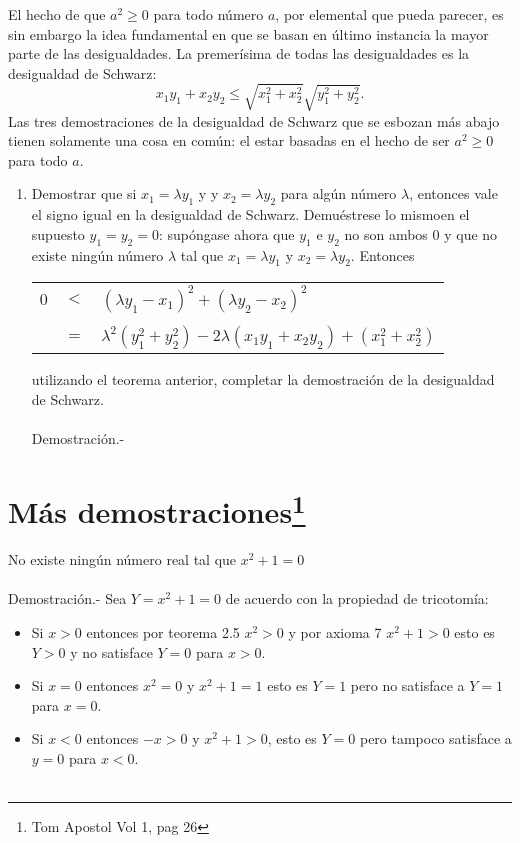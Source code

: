 \begin{teo}
El hecho de que $a^2 \geq 0$ para todo número $a$, por elemental que pueda parecer, es sin embargo la idea fundamental en que se basan en último instancia la mayor parte de las desigualdades. La premerísima de todas las desigualdades es la desigualdad de Schwarz: $$x_1y_1 + x_2y_2 \leq \sqrt{x_1^2 +x_2^2}\sqrt{y_1^2+y_2^2}.$$ Las tres demostraciones de la desigualdad de Schwarz que se esbozan más abajo tienen solamente una cosa en común: el estar basadas en el hecho de ser $a^2\geq 0$ para todo $a$.
\begin{enumerate}[\bfseries a)]
\item Demostrar que si $x_1=\lambda y_1$ \; y \; y $x_2=\lambda y_2$ para algún número $\lambda$, entonces vale el signo igual en la desigualdad de Schwarz. Demuéstrese lo mismoen el supuesto $y_1=y_2=0$: supóngase ahora que $y_1$ e $y_2$ no son ambos $0$ y que no existe ningún número $\lambda$ tal que $x_1=\lambda y_1$ \; y \; $x_2=\lambda y_2.$ Entonces
\begin{center}
\begin{tabular}{r c l}
$0$&$<$&$(\lambda y_1-x_1)^2+(\lambda y_2 -x_2)^2$\\\\
&$=$&$\lambda^2(y_1^2+y_2^2)-2\lambda(x_1 y_1 + x_2 y_2)+(x_1^2 +x_2^2)$\\
\end{tabular}
\end{center}
utilizando el teorema anterior, completar la demostración de la desigualdad de Schwarz.\\\\
Demostración.- \; 
\end{enumerate}
\end{teo}


\section[Más demostraciones]{Más demostraciones\footnote{Tom Apostol Vol 1, pag 26}}   
\begin{teo}
No existe ningún número real tal que $x^2+1=0$\\\\
Demostración.- \; Sea $Y=x^2+1=0$ de acuerdo con la propiedad de tricotomía:
\begin{itemize}
\item Si $x>0$ entonces por teorema 2.5 \; $x^2>0$ y por axioma 7 \; $x^2+1>0$ esto es $Y > 0$ y no satisface $Y=0$ para $x>0$.
\item Si $x=0$ entonces $x^2=0$ y $x^2+1=1$ esto es $Y=1$ pero no satisface a $Y=1$ para $x=0$.
\item Si $x<0$ entonces $-x>0$ y $x^2+1>0$, esto es $Y=0$ pero tampoco satisface a $y=0$ para $x<0$.\\\\ 
\end{itemize}
\end{teo}   
   
